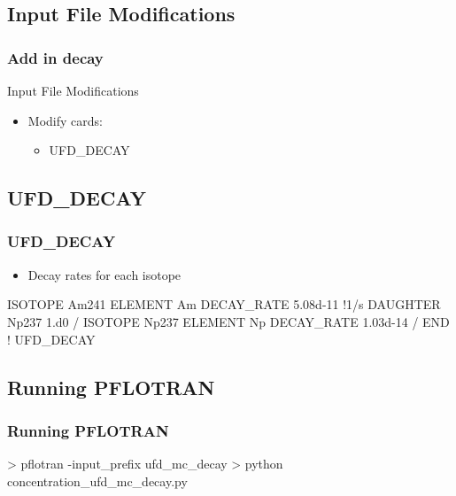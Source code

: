 \documentclass{beamer}
\newcommand\bluecomment[1]{{{\color{blue} #1}}}
\newcommand\magentacomment[1]{{{\color{magenta} #1}}}
\begin{document}
\subsection{Input File Modifications}

\begin{frame}[fragile]\frametitle{Add in decay}
	
	Input File Modifications
	\begin{itemize}
		\item Modify cards:
		\begin{itemize}
			\item UFD\_DECAY
		\end{itemize}
	\end{itemize}
	
\end{frame}

\subsection{UFD\_DECAY}

\begin{frame}[fragile]\frametitle{UFD\_DECAY}
	
	\begin{itemize}
		\item Decay rates for each isotope
	\end{itemize}
	
	\begin{semiverbatim}
ISOTOPE Am241
  ELEMENT Am
    DECAY_RATE \magentacomment{5.08d-11} \bluecomment{!1/s}
      \magentacomment{DAUGHTER Np237 1.d0}
    /
ISOTOPE Np237
  ELEMENT Np
    DECAY_RATE \magentacomment{1.03d-14}
  /		
END  \bluecomment{! UFD_DECAY}
		
	\end{semiverbatim}
	
\end{frame}

\subsection{Running PFLOTRAN}

\begin{frame}[fragile]\frametitle{Running PFLOTRAN}
	
	\begin{semiverbatim}
		
		
		> pflotran -input_prefix ufd_mc_decay
		> python concentration_ufd_mc_decay.py
		
	\end{semiverbatim}
	
\end{frame}
\end{document}
